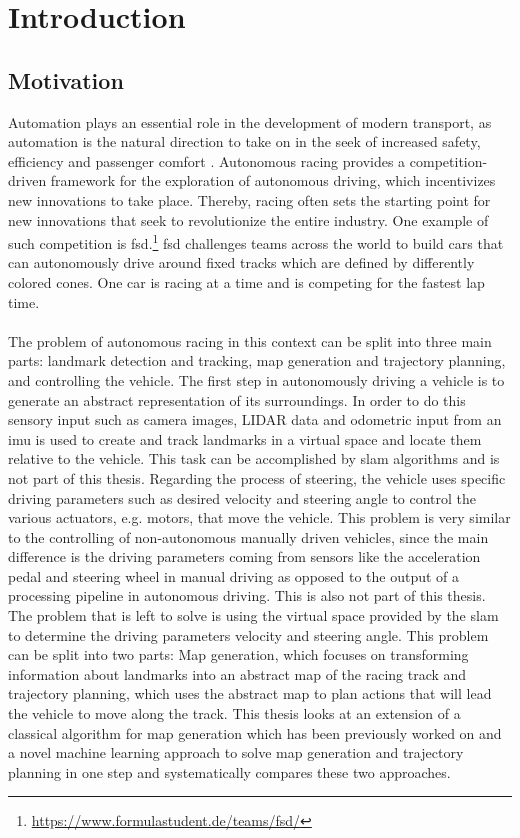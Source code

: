 \graphicspath{{Chapter/Figs/introduction/}}
\chapter{Introduction}

\section{Motivation}
Automation plays an essential role in the development of modern transport, as automation is the natural direction to take on in the seek of increased safety, efficiency and passenger comfort \cite{Lutin2018}. Autonomous racing provides a competition-driven framework for the exploration of autonomous driving, which incentivizes new innovations to take place. Thereby, racing often sets the starting point for new innovations that seek to revolutionize the entire industry\cite{Foxall91}. One example of such competition is \ac{fsd}.\footnote{\url{https://www.formulastudent.de/teams/fsd/}} \ac{fsd} challenges teams across the world to build cars that can autonomously drive around fixed tracks which are defined by differently colored cones. One car is racing at a time and is competing for the fastest lap time.\\
\\The problem of autonomous racing in this context can be split into three main parts: landmark detection and tracking, map generation and trajectory planning, and controlling the vehicle. The first step in autonomously driving a vehicle is to generate an abstract representation of its surroundings. In order to do this sensory input such as camera images, LIDAR data and odometric input from an \ac{imu} is used to create and track landmarks in a virtual space and locate them relative to the vehicle. This task can be accomplished by \ac{slam} algorithms \cite{Singandhupe2019} and is not part of this thesis. Regarding the process of steering, the vehicle uses specific driving parameters such as desired velocity and steering angle to control the various actuators, e.g. motors, that move the vehicle. This problem is very similar to the controlling of non-autonomous manually driven vehicles, since the main difference is the driving parameters coming from sensors like the acceleration pedal and steering wheel in manual driving as opposed to the output of a processing pipeline in autonomous driving. This is also not part of this thesis. The problem that is left to solve is using the virtual space provided by the \ac{slam} to determine the driving parameters velocity and steering angle. This problem can be split into two parts: Map generation, which focuses on transforming information about landmarks into an abstract map of the racing track and trajectory planning, which uses the abstract map to plan actions that will lead the vehicle to move along the track. This thesis looks at an extension of a classical algorithm for map generation which has been previously worked on and a novel machine learning approach to solve map generation and trajectory planning in one step and systematically compares these two approaches.\\
